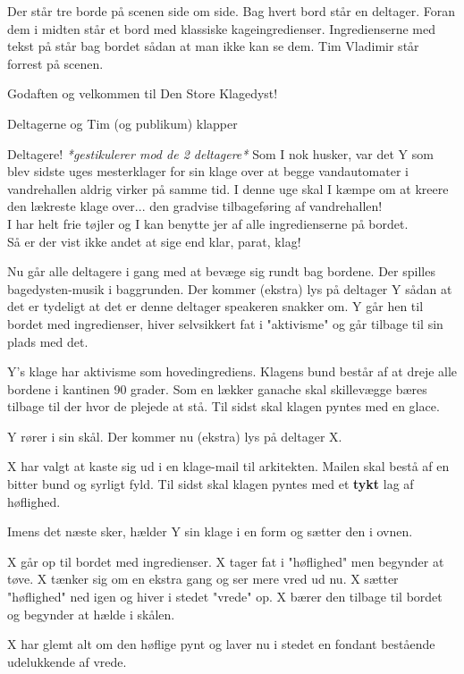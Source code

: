 \documentclass[a4paper,11pt]{article}
\begin{document}
\begin{sketch}
\scene Der står tre borde på scenen side om side. Bag hvert bord står en deltager. Foran dem i midten står et bord med klassiske kageingredienser. Ingredienserne med tekst på står bag bordet sådan at man ikke kan se dem. Tim Vladimir står forrest på scenen.

 Godaften og velkommen til Den Store Klagedyst!

\scene Deltagerne og Tim (og publikum) klapper

 Deltagere! \textit{*gestikulerer mod de 2 deltagere*} Som I nok husker, var det Y som blev sidste uges mesterklager for sin klage over at begge vandautomater i vandrehallen aldrig virker på samme tid. I denne uge skal I kæmpe om at kreere den lækreste klage over... den gradvise tilbageføring af vandrehallen! \\
I har helt frie tøjler og I kan benytte jer af alle ingredienserne på bordet. \\
Så er der vist ikke andet at sige end klar, parat, klag!  

\scene Nu går alle deltagere i gang med at bevæge sig rundt bag bordene. Der spilles bagedysten-musik i baggrunden. Der kommer (ekstra) lys på deltager Y sådan at det er tydeligt at det er denne deltager speakeren snakker om. Y går hen til bordet med ingredienser, hiver selvsikkert fat i "aktivisme" og går tilbage til sin plads med det. 

 Y's klage har aktivisme som hovedingrediens. Klagens bund består af at dreje alle bordene i kantinen 90 grader. Som en lækker ganache skal skillevægge bæres tilbage til der hvor de plejede at stå. Til sidst skal klagen pyntes med en glace.   

\scene Y rører i sin skål. Der kommer nu (ekstra) lys på deltager X. 

 X har valgt at kaste sig ud i en klage-mail til arkitekten. Mailen skal bestå af en bitter bund og syrligt fyld. Til sidst skal klagen pyntes med et \textbf{tykt} lag af høflighed.

\scene Imens det næste sker, hælder Y sin klage i en form og sætter den i ovnen.

\scene X går op til bordet med ingredienser.
X tager fat i "høflighed" men begynder at tøve. X tænker sig om en ekstra gang og ser mere vred ud nu. X sætter "høflighed" ned igen og hiver i stedet "vrede" op. X bærer den tilbage til bordet og begynder at hælde i skålen. 


 X har glemt alt om den høflige pynt og laver nu i stedet en fondant bestående udelukkende af vrede.


\end{sketch}
\end{document}
